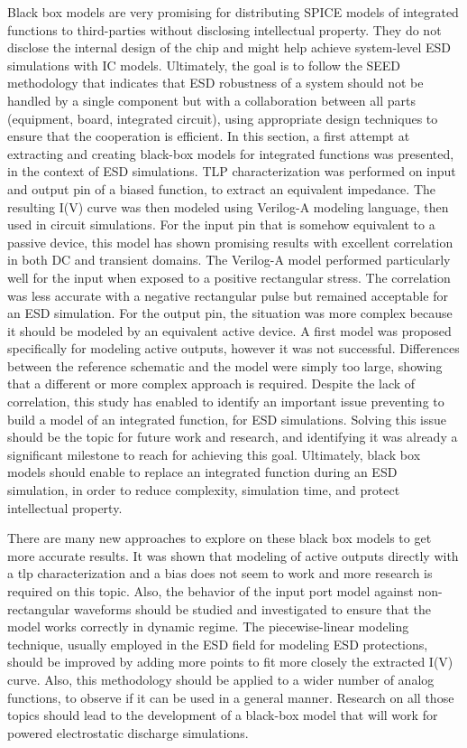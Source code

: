 Black box models are very promising for distributing SPICE models of integrated functions to third-parties without disclosing intellectual property.
They do not disclose the internal design of the chip and might help achieve system-level ESD simulations with IC models.
Ultimately, the goal is to follow the SEED \cite{seed} methodology that indicates that ESD robustness of a system should not be handled by a single component but with a collaboration between all parts (equipment, board, integrated circuit), using appropriate design techniques to ensure that the cooperation is efficient.
In this section, a first attempt at extracting and creating black-box models for integrated functions was presented, in the context of ESD simulations.
TLP characterization was performed on input and output pin of a biased function, to extract an equivalent impedance.
The resulting I(V) curve was then modeled using Verilog-A modeling language, then used in circuit simulations.
For the input pin that is somehow equivalent to a passive device, this model has shown promising results with excellent correlation in both DC and transient domains.
The Verilog-A model performed particularly well for the input when exposed to a positive rectangular stress.
The correlation was less accurate with a negative rectangular pulse but remained acceptable for an ESD simulation.
For the output pin, the situation was more complex because it should be modeled by an equivalent active device.
A first model was proposed specifically for modeling active outputs, however it was not successful.
Differences between the reference schematic and the model were simply too large, showing that a different or more complex approach is required.
Despite the lack of correlation, this study has enabled to identify an important issue preventing to build a model of an integrated function, for ESD simulations.
Solving this issue should be the topic for future work and research, and identifying it was already a significant milestone to reach for achieving this goal.
Ultimately, black box models should enable to replace an integrated function during an ESD simulation, in order to reduce complexity, simulation time, and protect intellectual property.

There are many new approaches to explore on these black box models to get more accurate results.
It was shown that modeling of active outputs directly with a \gls{tlp} characterization and a bias does not seem to work and more research is required on this topic.
Also, the behavior of the input port model against non-rectangular waveforms should be studied and investigated to ensure that the model works correctly in dynamic regime.
The piecewise-linear modeling technique, usually employed in the ESD field for modeling ESD protections, should be improved by adding more points to fit more closely the extracted I(V) curve.
Also, this methodology should be applied to a wider number of analog functions, to observe if it can be used in a general manner.
Research on all those topics should lead to the development of a black-box model that will work for powered electrostatic discharge simulations.
